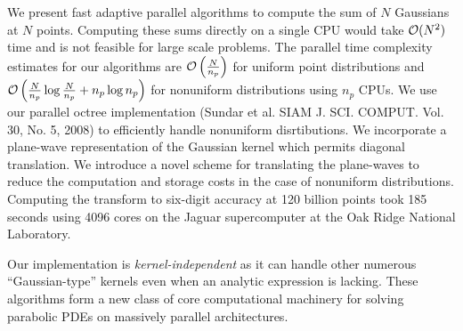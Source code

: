 We present fast adaptive parallel algorithms to compute the sum of $N$ Gaussians at $N$ points. 
Computing these sums directly on a single CPU would take $\mathcal{O}(N^2)$ time and is not feasible
for large scale problems. The parallel time complexity estimates for our algorithms are $ \mathcal{O} \left(\frac{N}{n_p} \right)$ 
for uniform point distributions and $ \mathcal{O}\left(\frac{N}{n_p}\log \frac{N}{n_p} + n_p \log n_p\right)$ 
for nonuniform distributions using $n_p$ CPUs. We use our parallel octree implementation (Sundar et al. 
SIAM J. SCI. COMPUT. Vol. 30, No. 5, 2008) to efficiently handle nonuniform disrtibutions. We incorporate
 a plane-wave representation of the Gaussian kernel which permits diagonal translation. We introduce a 
 novel scheme for translating the plane-waves to reduce the computation and storage costs in the case of 
 nonuniform distributions. Computing the transform to six-digit accuracy at 120 billion points took
 185 seconds using 4096 cores on the Jaguar supercomputer at the Oak Ridge National Laboratory. 

Our implementation is {\em kernel-independent} as it can handle other numerous ``Gaussian-type'' kernels even
 when an analytic expression is lacking. These algorithms form a new class of core computational machinery 
 for solving parabolic PDEs on massively parallel architectures. 